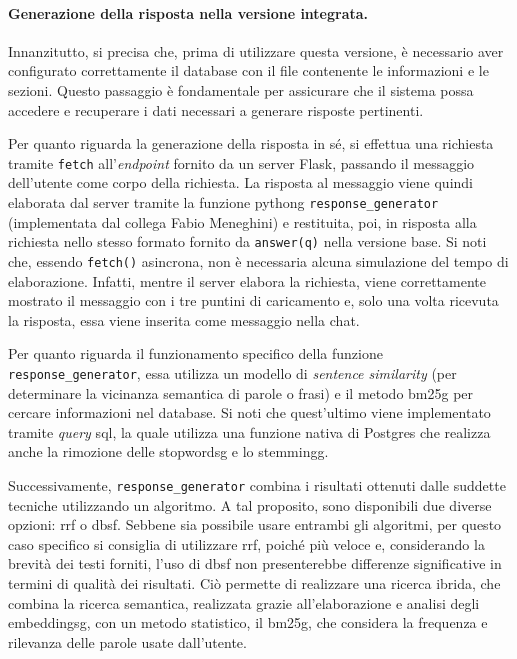 \paragraph{Generazione della risposta nella versione integrata.} Innanzitutto, si precisa che, prima di utilizzare questa versione, è necessario aver configurato correttamente il database con il file contenente le informazioni e 
le sezioni. Questo passaggio è fondamentale per assicurare che il sistema possa accedere e recuperare i dati necessari a generare risposte pertinenti.

Per quanto riguarda la generazione della risposta in sé, si effettua una richiesta tramite \texttt{fetch} all'\emph{endpoint} fornito da un server Flask, passando il messaggio dell'utente come corpo della richiesta. 
La risposta al messaggio viene quindi elaborata dal server tramite la funzione \gls{pythong} \texttt{response\_generator} (implementata dal collega Fabio Meneghini) e restituita, poi, in risposta alla richiesta 
nello stesso formato fornito da \texttt{answer(q)} nella versione base.
Si noti che, essendo \texttt{fetch()} asincrona, non è necessaria alcuna simulazione del tempo di elaborazione. Infatti, mentre il server elabora la richiesta, viene correttamente 
mostrato il messaggio con i tre puntini di caricamento e, solo una volta ricevuta la risposta, essa viene inserita come messaggio nella chat.

Per quanto riguarda il funzionamento specifico della funzione \texttt{response\_generator}, essa utilizza un modello di \emph{sentence similarity} (per determinare la vicinanza semantica di parole o frasi) e il metodo \gls{bm25g} per cercare informazioni 
nel database. 
Si noti che quest'ultimo viene implementato tramite \emph{query} \gls{sql}, la quale utilizza una funzione nativa di Postgres che realizza anche la rimozione delle \gls{stopwordsg} e lo \gls{stemmingg}.

Successivamente, \texttt{response\_generator} combina i risultati ottenuti dalle suddette tecniche utilizzando un algoritmo. A tal proposito, sono disponibili due diverse opzioni: \gls{rrf} o \gls{dbsf}.
Sebbene sia possibile usare entrambi gli algoritmi, per questo caso specifico si consiglia di utilizzare \gls{rrf}, poiché più veloce e, considerando la brevità dei testi forniti, 
l'uso di \gls{dbsf} non presenterebbe differenze significative in termini di qualità dei risultati.
Ciò permette di realizzare una ricerca ibrida, che combina la ricerca semantica, realizzata grazie all'elaborazione e analisi degli \gls{embeddingsg}, con un metodo statistico, il \gls{bm25g}, che considera la frequenza e 
rilevanza delle parole usate dall'utente.   



